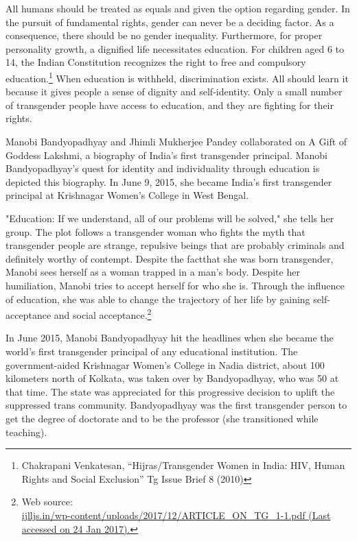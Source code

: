 \begin{multicols}{2}

\noi
All humans should be treated as equals and given the option regarding gender. In the pursuit
of fundamental rights, gender can never be a deciding factor. As a consequence, there should
be no gender inequality. Furthermore, for proper personality growth, a dignified life
necessitates education. For children aged 6 to 14, the Indian Constitution recognizes the right to free and compulsory education.\footnote{Chakrapani Venkatesan, “Hijras/Transgender Women in India: HIV, Human Rights and Social Exclusion” Tg Issue Brief 8 (2010)} When education is withheld, discrimination exists. All should learn it because it gives people a sense of dignity and self-identity. Only a small number of transgender people have access to education, and they are fighting for their rights.

\noi
Manobi Bandyopadhyay and Jhimli Mukherjee Pandey collaborated on A Gift of Goddess
Lakshmi, a biography of India's first transgender principal. Manobi Bandyopadhyay's quest for
identity and individuality through education is depicted this biography. In June 9, 2015, she
became India's first transgender principal at Krishnagar Women's College in West Bengal.

\noi
"Education: If we understand, all of our problems will be solved," she tells her group. The plot
follows a transgender woman who fights the myth that transgender people are strange, repulsive
beings that are probably criminals and definitely worthy of contempt. Despite the factthat she
was born transgender, Manobi sees herself as a woman trapped in a man's body. Despite her
humiliation, Manobi tries to accept herself for who she is. Through the influence of education,
she was able to change the trajectory of her life by gaining self-acceptance and social
acceptance.\footnote{Web source:\\ \url{ijlljs.in/wp-content/uploads/2017/12/ARTICLE_ON_TG_1-1.pdf (Last accessed on 24 Jan 2017).}}

\noi
In June 2015, Manobi Bandyopadhyay hit the headlines when she became the world's first
transgender principal of any educational institution. The government-aided Krishnagar
Women's College in Nadia district, about 100 kilometers north of Kolkata, was taken over by
Bandyopadhyay, who was 50 at that time. The state was appreciated for this progressive
decision to uplift the suppressed trans community. Bandyopadhyay was the first transgender
person to get the degree of doctorate and to be the professor (she transitioned while teaching).


\end{multicols}

